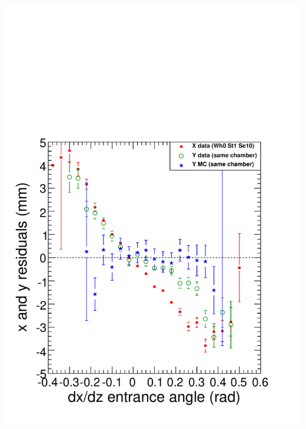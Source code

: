 \documentclass[compress]{beamer}
\begin{document}
\begin{frame}
\begin{columns}
\includegraphics[width=\linewidth]{evenstranger_sawtooth.pdf}
\end{columns}
\label{numpages}
\end{frame}
\end{document}
